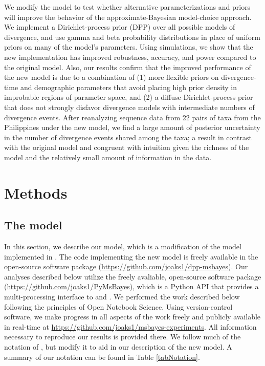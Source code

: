 We modify the \msb model to test whether alternative parameterizations and
priors will improve the behavior of the approximate-Bayesian model-choice
approach.
We implement a Dirichlet-process prior (DPP) over all possible models of
divergence, and use gamma and beta probability distributions in place of
uniform priors on many of the model's parameters.
Using simulations, we show that the new implementation has improved robustness,
accuracy, and power compared to the original model.
Also, our results confirm that the improved performance of the new model
is due to a combination of
(1) more flexible priors on divergence-time and demographic parameters that
avoid placing high prior density in improbable regions of parameter space, and
(2) a diffuse Dirichlet-process prior that does not strongly disfavor
divergence models with intermediate numbers of divergence events.
After reanalyzing sequence data from 22 pairs of taxa from the Philippines
\citep{Oaks2012} under the new model, we find a large amount of posterior
uncertainty in the number of divergence events shared among the taxa; a result
in contrast with the original \msb model \citep{Oaks2012} and congruent with
intuition given the richness of the model and the relatively small amount of
information in the data.


\section*{Methods}

\subsection*{The model}
In this section, we describe our model, which is a modification of the model
implemented in \msb \citep{Huang2011,Oaks2012}.
The code implementing the new model is freely available in the open-source
software package \dppmsbayes
(\href{https://github.com/joaks1/dpp-msbayes}{https://github.com/joaks1/dpp-msbayes}).
Our analyses described below utilize the freely avaliable, open-source software
package \pymsbayes (\href{https://github.com/joaks1/PyMsBayes}{https://github.com/joaks1/PyMsBayes}),
which is a Python API that provides a multi-processing interface to \msb and
\dppmsbayes.
We performed the work described below following the principles of
Open Notebook Science.
Using version-control software, we make progress in all aspects of the work
freely and publicly available in real-time at
\href{https://github.com/joaks1/msbayes-experiments}{https://github.com/joaks1/msbayes-experiments}.
All information necessary to reproduce our results is provided there.
We follow much of the notation of \citet{Oaks2012}, but modify it to
aid in our description of the new model.
A summary of our notation can be found in Table \ref{tabNotation}.

